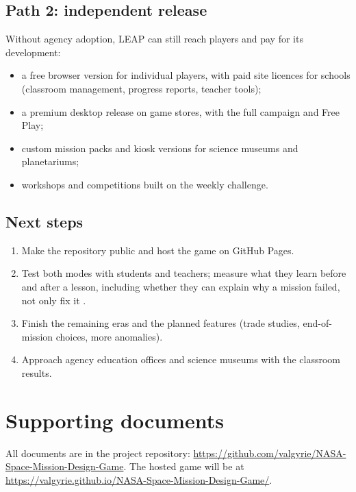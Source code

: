 \documentclass[11pt,a4paper]{article}
\begin{document}
\subsection{Path 2: independent release}
Without agency adoption, LEAP can still reach players and pay for its development:
\begin{itemize}
  \item a free browser version for individual players, with paid site licences for schools (classroom management,
        progress reports, teacher tools);
  \item a premium desktop release on game stores, with the full campaign and Free Play;
  \item custom mission packs and kiosk versions for science museums and planetariums;
  \item workshops and competitions built on the weekly challenge.
\end{itemize}


\subsection{Next steps}
\begin{enumerate}
  \item Make the repository public and host the game on GitHub Pages.
  \item Test both modes with students and teachers; measure what they learn before and after a lesson, including
        whether they can explain why a mission failed, not only fix it \cite{herder2022}.
  \item Finish the remaining eras and the planned features (trade studies, end-of-mission choices, more anomalies).
  \item Approach agency education offices and science museums with the classroom results.
\end{enumerate}

\section{Supporting documents}

All documents are in the project repository: \url{https://github.com/valgyrie/NASA-Space-Mission-Design-Game}.
The hosted game will be at \url{https://valgyrie.github.io/NASA-Space-Mission-Design-Game/}.
\end{document}
